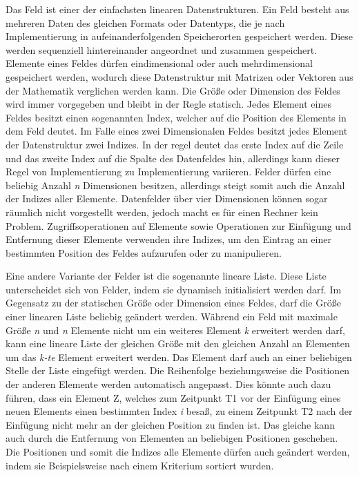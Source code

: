 Das Feld ist einer der einfachsten linearen Datenstrukturen. Ein Feld besteht aus mehreren Daten des gleichen Formats oder Datentyps, die je nach Implementierung in aufeinanderfolgenden Speicherorten gespeichert werden. Diese werden sequenziell hintereinander angeordnet und zusammen gespeichert. Elemente eines Feldes dürfen eindimensional oder auch mehrdimensional gespeichert werden, wodurch diese Datenstruktur mit Matrizen oder Vektoren aus der Mathematik verglichen werden kann. Die Größe oder Dimension des Feldes wird immer vorgegeben und bleibt in der Regle statisch. Jedes Element eines Feldes besitzt einen sogenannten Index, welcher auf die Position des Elements in dem Feld deutet. Im Falle eines zwei Dimensionalen Feldes besitzt jedes Element der Datenstruktur zwei Indizes. In der regel deutet das erste Index auf die Zeile und das zweite Index auf die Spalte des Datenfeldes hin, allerdings kann dieser Regel von Implementierung zu Implementierung variieren. Felder dürfen eine beliebig Anzahl \textit{n} Dimensionen besitzen, allerdings steigt somit auch die Anzahl der Indizes aller Elemente. Datenfelder über vier Dimensionen können sogar räumlich nicht vorgestellt werden, jedoch macht es für einen Rechner kein Problem. Zugriffsoperationen auf Elemente sowie Operationen zur Einfügung und Entfernung dieser Elemente verwenden ihre Indizes, um den Eintrag an einer bestimmten Position des Feldes aufzurufen oder zu manipulieren. \autocite[35-36]{ollmert_datenstrukturen_2020}

Eine andere Variante der Felder ist die sogenannte lineare Liste. Diese Liste unterscheidet sich von Felder, indem sie dynamisch initialisiert werden darf. Im Gegensatz zu der statischen Größe oder Dimension eines Feldes, darf die Größe einer linearen Liste beliebig geändert werden. Während ein Feld mit maximale Größe \textit{n} und \textit{n} Elemente nicht um ein weiteres Element \textit{k} erweitert werden darf, kann eine lineare Liste der gleichen Größe mit den gleichen Anzahl an Elementen um das \textit{k-te} Element erweitert werden. Das Element darf auch an einer beliebigen Stelle der Liste eingefügt werden. Die Reihenfolge beziehungsweise die Positionen der anderen Elemente werden automatisch angepasst. Dies könnte auch dazu führen, dass ein Element Z, welches zum Zeitpunkt T1 vor der Einfügung eines neuen Elements einen bestimmten Index \textit{i} besaß, zu einem Zeitpunkt T2 nach der Einfügung nicht mehr an der gleichen Position zu finden ist. Das gleiche kann auch durch die Entfernung von Elementen an beliebigen Positionen geschehen. Die Positionen und somit die Indizes alle Elemente dürfen auch geändert werden, indem sie Beispielsweise nach einem Kriterium sortiert wurden. \autocite[40-42]{ollmert_datenstrukturen_2020}

